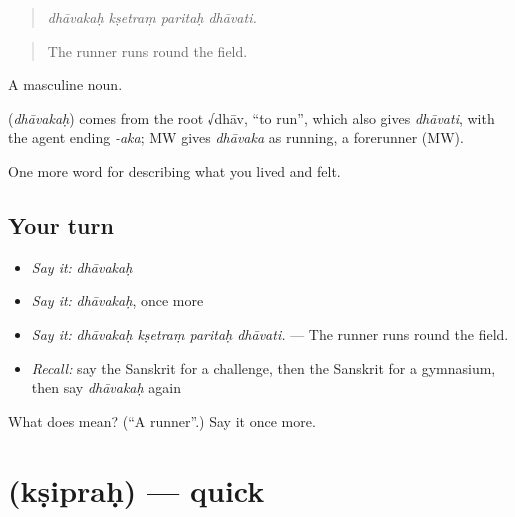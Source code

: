 \begin{quote}
   
\end{quote}

\begin{quote}
\emph{dhāvakaḥ kṣetraṃ paritaḥ dhāvati.}
\end{quote}

\begin{quote}
The runner runs round the field.
\end{quote}

A masculine noun.

\begin{cousinweb}
\textbf{} (\emph{dhāvakaḥ}) comes from the root √dhāv, \textquotedblleft{}to run\textquotedblright{}, which also gives \emph{dhāvati}, with the agent ending \emph{-aka}; MW gives \emph{dhāvaka} as running, a forerunner (MW).
\end{cousinweb}

\begin{grammarlens}[title={What you've built}]
One more word for describing what you lived and felt.
\end{grammarlens}

\subsection*{Your turn}
\begin{itemize}
\raggedright
  \item \emph{Say it:} \emph{dhāvakaḥ}
  \item \emph{Say it:} \emph{dhāvakaḥ}, once more
  \item \emph{Say it:} \emph{dhāvakaḥ kṣetraṃ paritaḥ dhāvati.} — The runner runs round the field.
  \item \emph{Recall:} say the Sanskrit for a challenge, then the Sanskrit for a gymnasium, then say \emph{dhāvakaḥ} again
\end{itemize}

\begin{tcolorbox}[breakable,colback=teal!4,colframe=teal!35!black,title={Before you move on}]
What does  mean? (\textquotedblleft{}A runner\textquotedblright{}.) Say it once more.
\end{tcolorbox}
\section[\texorpdfstring{\sk{क्षिप्रः} (kṣipraḥ)}{क्षिप्रः (kṣipraḥ)}]{ (kṣipraḥ) — quick}

